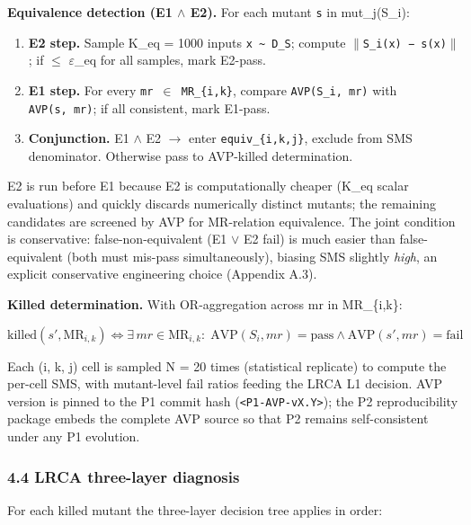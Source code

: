 \documentclass[review,12pt,authoryear]{elsarticle}
\providecommand{\tightlist}{\setlength{\itemsep}{0pt}\setlength{\parskip}{0pt}}
\begin{document}
\textbf{Equivalence detection (E1 $\wedge$ E2).} For each mutant
\texttt{s\textquotesingle{}} in mut\_j(S\_i):

\begin{enumerate}
\def\labelenumi{\arabic{enumi}.}
\tightlist
\item
  \textbf{E2 step.} Sample K\_eq = 1000 inputs
  \texttt{x\ \textasciitilde{}\ D\_S}; compute
  \texttt{$\|$S\_i(x)\ −\ s\textquotesingle{}(x)$\|$}; if $\leq$ $\varepsilon$\_eq for all
  samples, mark E2-pass.
\item
  \textbf{E1 step.} For every \texttt{mr\ $\in$\ MR\_\{i,k\}}, compare
  \texttt{AVP(S\_i,\ mr)} with \texttt{AVP(s\textquotesingle{},\ mr)};
  if all consistent, mark E1-pass.
\item
  \textbf{Conjunction.} E1 $\wedge$ E2 $\to$ enter \texttt{equiv\_\{i,k,j\}},
  exclude from SMS denominator. Otherwise pass to AVP-killed
  determination.
\end{enumerate}

E2 is run before E1 because E2 is computationally cheaper (K\_eq scalar
evaluations) and quickly discards numerically distinct mutants; the
remaining candidates are screened by AVP for MR-relation equivalence.
The joint condition is conservative: false-non-equivalent (E1 $\vee$ E2 fail)
is much easier than false-equivalent (both must mis-pass
simultaneously), biasing SMS slightly \emph{high}, an explicit
conservative engineering choice (Appendix A.3).

\textbf{Killed determination.} With OR-aggregation across mr in
MR\_\{i,k\}:

\[ \mathrm{killed}(s', \mathrm{MR}_{i,k}) \iff \exists\,mr \in \mathrm{MR}_{i,k}:\; \mathrm{AVP}(S_i, mr) = \text{pass} \wedge \mathrm{AVP}(s', mr) = \text{fail} \]

Each (i, k, j) cell is sampled N = 20 times (statistical replicate) to
compute the per-cell SMS, with mutant-level fail ratios feeding the LRCA
L1 decision. AVP version is pinned to the P1 commit hash
(\texttt{\textless{}P1-AVP-vX.Y\textgreater{}}); the P2 reproducibility
package embeds the complete AVP source so that P2 remains
self-consistent under any P1 evolution.

\subsubsection{4.4 LRCA three-layer diagnosis}\label{lrca-three-layer-diagnosis}

For each killed mutant the three-layer decision tree applies in order:
\end{document}

